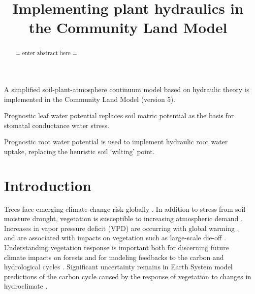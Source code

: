 \documentclass[draft,linenumbers]{agujournal}
\begin{document}
\title{Implementing plant hydraulics in the Community Land Model}



\begin{keypoints}
\item A simplified soil-plant-atmosphere continuum model based on hydraulic theory is implemented in the Community Land Model (version 5).
\item Prognostic leaf water potential replaces soil matric potential as the basis for stomatal conductance water stress. 
\item Prognostic root water potential is used to implement hydraulic root water uptake, replacing the heuristic soil `wilting' point.
\end{keypoints}



\begin{abstract}
= enter abstract here =
\end{abstract}


\section{Introduction}

Trees face emerging climate change risk globally \citep{allen2010,anderegg2013b}.
In addition to stress from soil moisture drought, vegetation is susceptible to increasing atmospheric demand \citep{restaino2016,novick2016b,lemordant2018}.
Increases in vapor pressure deficit (VPD) are occurring with global warming \citep{ficklin2017,seager2015}, and are associated with impacts on vegetation such as large-scale die-off \citep{williams2013,mcdowell2015}.
Understanding vegetation response is important both for discerning future climate impacts on forests and for modeling feedbacks to the carbon and hydrological cycles \citep{lemordant2018}.
Significant uncertainty remains in Earth System model predictions of the carbon cycle caused by the response of vegetation to changes in hydroclimate \citep{dekauwe2017,friedlingstein2014,trugman2018}.
\end{document}
